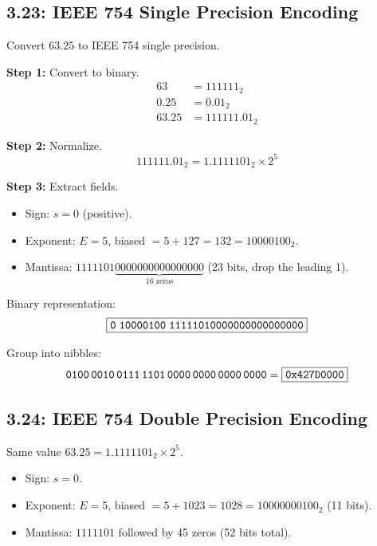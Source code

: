 \subsection*{3.23: IEEE 754 Single Precision Encoding}
\hypertarget{sol-3.23}{}

Convert $63.25$ to IEEE 754 single precision.

\noindent\textbf{Step 1:} Convert to binary.
\begin{align*}
  63 &= 111111_2 \\
  0.25 &= 0.01_2 \\
  63.25 &= 111111.01_2
\end{align*}

\noindent\textbf{Step 2:} Normalize.
\[
  111111.01_2 = 1.1111101_2 \times 2^5
\]

\noindent\textbf{Step 3:} Extract fields.
\begin{itemize}
  \item Sign: $s = 0$ (positive).
  \item Exponent: $E = 5$, biased $= 5 + 127 = 132 = 10000100_2$.
  \item Mantissa: $1111101\underbrace{0000000000000000}_{16\text{ zeros}}$
        (23 bits, drop the leading 1).
\end{itemize}

Binary representation:
\[
  \boxed{\texttt{0\;10000100\;11111010000000000000000}}
\]

Group into nibbles:
\[
  \texttt{0100\,0010\,0111\,1101\,0000\,0000\,0000\,0000} = \boxed{\texttt{0x427D0000}}
\]

\subsection*{3.24: IEEE 754 Double Precision Encoding}
\hypertarget{sol-3.24}{}

Same value $63.25 = 1.1111101_2 \times 2^5$.

\begin{itemize}
  \item Sign: $s = 0$.
  \item Exponent: $E = 5$, biased $= 5 + 1023 = 1028 = 10000000100_2$ (11 bits).
  \item Mantissa: $1111101$ followed by 45 zeros (52 bits total).
\end{itemize}

